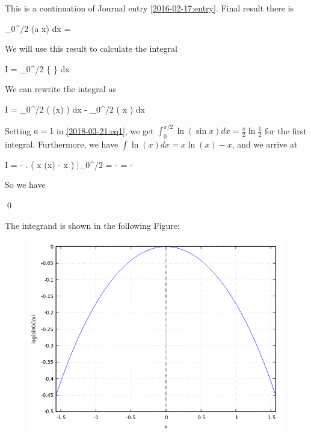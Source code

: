 
This is a continuation of Journal entry \ref{2016-02-17:entry}. Final result there is

\be
\label{2018-03-21:eq1}
\int_0^{\pi/2} \ln(a \sin x) dx =  \ln {}
\ee

We will use this result to calculate the integral

\bee
I = \int_{0}^{\pi/2} \ln \left\{ \right\} dx
\eee

We can rewrite the integral as

\bee
I = \int_{0}^{\pi/2} \ln \left( \sin(x) \right) dx - \int_{0}^{\pi/2} \ln \left( x \right) dx
\eee

Setting $a=1$ in \eqref{2018-03-21:eq1}, we get $\int_0^{\pi/2} \ln(\sin x) dx = \frac{\pi}{2} \ln \frac{1}{2}$ for the first integral. Furthermore, we have $\int \ln(x) dx = x \ln(x)-x$, and we arrive at

\bee
I =  - \left. \left( x \ln(x) - x \right) \right|_{0}^{\pi/2} =  -  =  -  \log \pi
\eee

So we have

\bee
{} \qed
\eee

The integrand is shown in the following Figure:

\begin{figure}[H]
	\includegraphics[scale=0.7]{images/interesting_integrals_06_1.png}
\end{figure}

